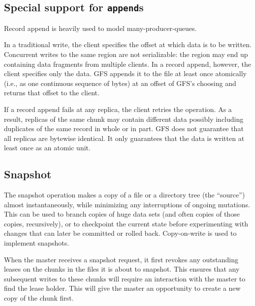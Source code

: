 \documentclass{article}
\begin{document}
\subsection{Special support for \texttt{append}s}

Record append is heavily used to model many-producer-queues.

In a traditional write, the client specifies the offset at which data is to be
written. Concurrent writes to the same region are not serializable: the region
may end up containing data fragments from multiple clients. In a record append,
however, the client specifies only the data. GFS appends it to the file at
least once atomically (i.e., as one continuous sequence of bytes) at an offset
of GFS’s choosing and returns that offset to the client. 

If a record append fails at any replica, the client retries the operation. As a
result, replicas of the same chunk may contain different data possibly including
duplicates of the same record in whole or in part. GFS does not guarantee that
all replicas are bytewise identical. It only guarantees that the data is
written at least once as an atomic unit. 

\subsection{Snapshot}

The snapshot operation makes a copy of a file or a directory tree (the
“source”) almost instantaneously, while minimizing any interruptions of ongoing
mutations. This can be used to branch copies of huge data sets
(and often copies of those copies, recursively), or to checkpoint the current
state before experimenting with changes that can later be committed or rolled
back. Copy-on-write is used to implement snapshots. 

When the master receives a snapshot request, it first
revokes any outstanding leases on the chunks in the files it is about to
snapshot. This ensures that any subsequent writes to these chunks will require
an interaction with the master to find the lease holder. This will give the
master an opportunity to create a new copy of the chunk first. 
\end{document}
